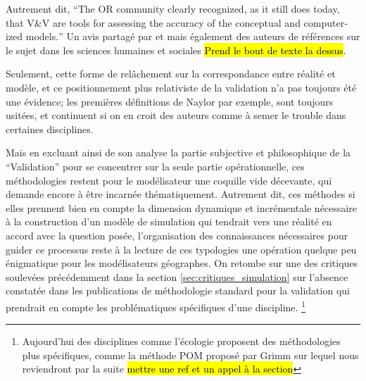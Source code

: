 Autrement dit, \foreignquote{english}{The OR community clearly recognized, as it still does today, that V\&V are tools for assessing the accuracy of the conceptual and computerized models.} Un avis partagé par \autocite{Kleijnen1995}  et \autocite{Sargent2010}  mais également des auteurs de références sur le sujet dans les sciences humaines et sociales \autocite{Amblard2006} \hl{Prend le bout de texte la dessus}.

Seulement, cette forme de relâchement sur la correspondance entre réalité et modèle, et ce positionnement plus relativiste de la validation n'a pas toujours été une évidence; les premières définitions de Naylor par exemple, sont toujours usitées, et continuent si on en croit des auteurs comme \textcite{Kleindorfer1998} à semer le trouble dans certaines disciplines.


Mais en excluant ainsi de son analyse la partie subjective et philosophique de la \enquote{Validation} pour se concentrer sur la seule partie opérationnelle, ces méthodologies restent pour le modélisateur une coquille vide décevante, qui demande encore à être incarnée thématiquement. Autrement dit, ces méthodes si elles prennent bien en compte la dimension dynamique et incrémentale nécessaire à la construction d'un modèle de simulation qui tendrait vers une réalité en accord avec la question posée, l'organisation des connaissances nécessaires pour guider ce processus reste à la lecture de ces typologies une opération quelque peu énigmatique pour les modélisateurs géographes. On retombe sur une des critiques soulevées précédemment dans la section \ref{sec:critiques_simulation} sur l'absence constatée dans les publications de méthodologie standard pour la validation qui prendrait en compte les problématiques spécifiques d'une discipline. \footnote{Aujourd'hui des disciplines comme l'écologie proposent des méthodologies plus spécifiques, comme la méthode POM proposé par Grimm sur lequel nous reviendront par la suite \hl{mettre une ref et un appel à la section}}

